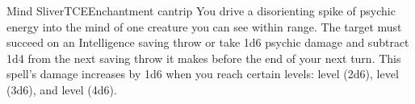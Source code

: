 \begin{spell}{Mind Sliver}{TCE}{Enchantment cantrip}
{
}
You drive a disorienting spike of psychic energy into
the mind of one creature you can see within range.
The target must succeed on an Intelligence saving
throw or take 1d6 psychic damage and subtract 1d4
from the next saving throw it makes before the end
of your next turn.
This spell's damage increases by 1d6 when you
reach certain levels:  level (2d6),  level (3d6),
and  level (4d6).
\end{spell}

